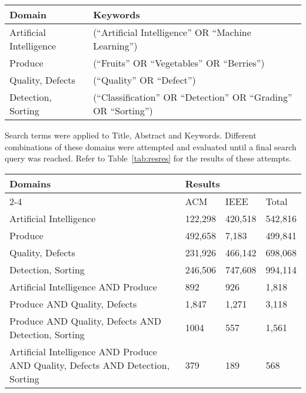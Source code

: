 \documentclass[conference]{IEEEtran}
\begin{document}
\begin{table*}
	\caption{Domains and keywords used to select search terms}
	\label{tab:resdom}

	\begin{tabular}{ll}
	\hline
		Domain & Keywords \\
	\hline
		Artificial Intelligence & (``Artificial Intelligence'' OR ``Machine Learning'') \\
		Produce & (``Fruits'' OR ``Vegetables'' OR ``Berries'') \\
		Quality, Defects & (``Quality'' OR ``Defect'') \\
		Detection, Sorting & (``Classification'' OR ``Detection'' OR ``Grading'' OR ``Sorting'') \\
	\hline
	\end{tabular}
\end{table*}

Search terms were applied to Title, Abstract and Keywords. Different combinations of these domains were attempted and evaluated until a final search query was reached. Refer to Table~\ref{tab:resres} for the results of these attempts.

\begin{table*}[]
\caption{Combination of domains and respective results}
\label{tab:resres}
\begin{tabular}{llll}
\hline
\multirow{2}{*}{Domains}            & \multicolumn{3}{l}{Results} \\ \cline{2-4} 
                                    & ACM     & IEEE    & Total   \\ \hline
Artificial Intelligence             & 122,298 & 420,518 & 542,816 \\
Produce                             & 492,658 & 7,183   & 499,841 \\
Quality, Defects                    & 231,926 & 466,142 & 698,068 \\
Detection, Sorting                  & 246,506 & 747,608 & 994,114 \\
Artificial Intelligence AND Produce & 892     & 926     & 1,818   \\
Produce AND Quality, Defects        & 1,847   & 1,271   & 3,118   \\
Produce AND Quality, Defects AND Detection, Sorting                             & 1004 & 557 & 1,561 \\
Artificial Intelligence AND Produce AND Quality, Defects AND Detection, Sorting & 379  & 189 & 568   \\ \hline
\end{tabular}
\end{table*}
\end{document}
